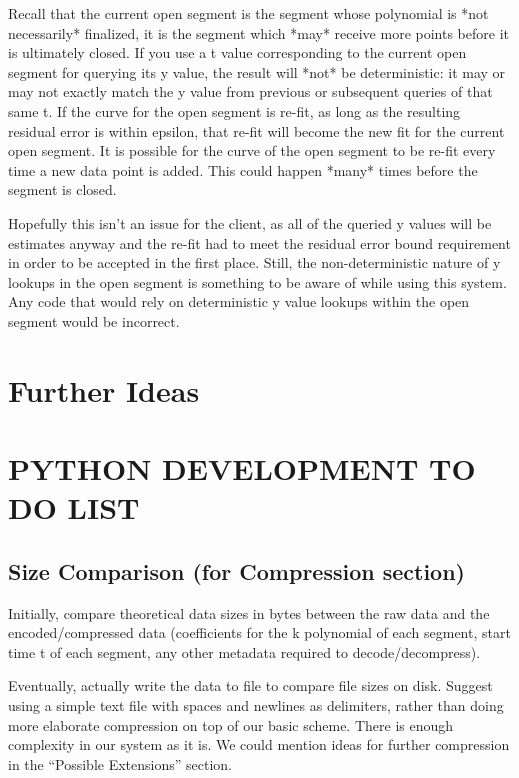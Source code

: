 \documentclass{article}
\begin{document}
Recall that the current open segment is the segment whose polynomial is *not necessarily* finalized, it is the segment which *may* receive more points before it is ultimately closed. If you use a t value corresponding to the current open segment for querying its y value, the result will *not* be deterministic: it may or may not exactly match the y value from previous or subsequent queries of that same t.
If the curve for the open segment is re-fit, as long as the resulting residual error is within epsilon, that re-fit will become the new fit for the current open segment. It is possible for the curve of the open segment to be re-fit every time a new data point is added. This could happen *many* times before the segment is closed.

Hopefully this isn’t an issue for the client, as all of the queried y values will be estimates anyway and the re-fit had to meet the residual error bound requirement in order to be accepted in the first place. Still, the non-deterministic nature of y lookups in the open segment is something to be aware of while using this system. Any code that would rely on deterministic y value lookups within the open segment would be incorrect.


\section{Further Ideas}


\section{PYTHON DEVELOPMENT TO DO LIST}

\subsection{Size Comparison (for Compression section)}
Initially, compare theoretical data sizes in bytes between the raw data and the encoded/compressed data (coefficients for the k polynomial of each segment, start time t of each segment, any other metadata required to decode/decompress).

Eventually, actually write the data to file to compare file sizes on disk. Suggest using a simple text file with spaces and newlines as delimiters, rather than doing more elaborate compression on top of our basic scheme. There is enough complexity in our system as it is.
We could mention ideas for further compression in the “Possible Extensions” section.
\end{document}
